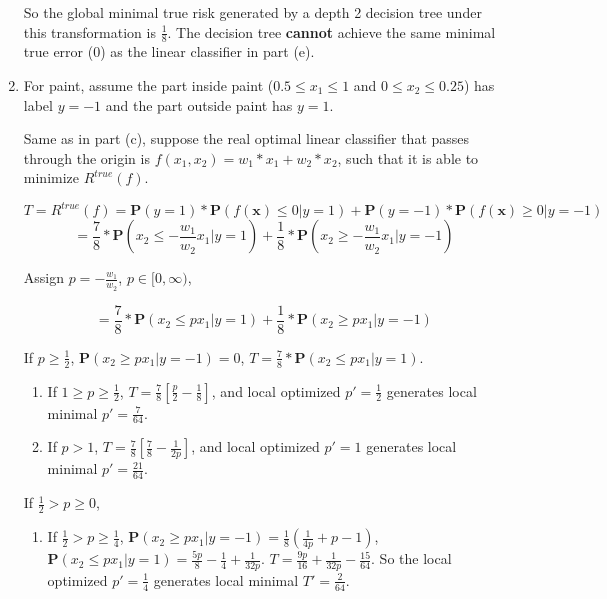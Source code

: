 \documentclass[paper=letter, fontsize=12pt]{article}
\begin{document}
\begin{enumerate}[label=(\alph*)]
	So the global minimal true risk generated by a depth 2 decision tree under this transformation is $\frac{1}{8}$. The decision tree \textbf{cannot} achieve the same minimal true error (0) as the linear classifier in part (e).
	
	\item For paint, assume the part inside paint ($0.5 \leq x_1 \leq 1$ and $0 \leq x_2 \leq 0.25$) has label $y = -1$ and the part outside paint has $y = 1$.
	 
	Same as in part (c), suppose the real optimal linear classifier that passes through the origin is $f(x_1, x_2) = w_1 * x_1 + w_2 * x_2$, such that it is able to minimize $R^{true}(f)$.
	
	\begin{equation}
	T = R^{true}(f) = \mathbf{P}(y = 1) * \mathbf{P}(f(\mathbf{x}) \leq 0 | y = 1) + \mathbf{P}(y = -1) * \mathbf{P}(f(\mathbf{x}) \geq 0 | y = -1)
	\end{equation}
	\begin{equation}
	= \frac{7}{8} * \mathbf{P}(x_2 \leq -\frac{w_1}{w_2} x_1 | y = 1) + \frac{1}{8} * \mathbf{P}(x_2 \geq -\frac{w_1}{w_2} x_1 | y = -1)
	\end{equation}
	
	Assign $p = -\frac{w_1}{w_2}$, $p \in [0, \infty)$,
	
	\begin{equation}
	= \frac{7}{8} * \mathbf{P}(x_2 \leq p x_1 | y = 1) + \frac{1}{8} * \mathbf{P}(x_2 \geq p x_1 | y = -1)
	\end{equation}
	
	If $p \geq \frac{1}{2}$, $\mathbf{P}(x_2 \geq p x_1 | y = -1) = 0$, $T = \frac{7}{8} * \mathbf{P}(x_2 \leq p x_1 | y = 1) $.
	
	\begin{enumerate}[label=(\roman*)]
		\item If $1 \geq p \geq \frac{1}{2}$, $T = \frac{7}{8}[\frac{p}{2} - \frac{1}{8}]$, and local optimized $p' = \frac{1}{2}$ generates local minimal $p' = \frac{7}{64}$.
		
		\item If $p > 1$, $T = \frac{7}{8}[\frac{7}{8} - \frac{1}{2p}]$, and local optimized $p' = 1$ generates local minimal $p' = \frac{21}{64}$.
	\end{enumerate}

	If $\frac{1}{2} > p \geq 0$,
	
	\begin{enumerate}[label=(\roman*)]
		\item If $\frac{1}{2} > p \geq \frac{1}{4}$,  $\mathbf{P}(x_2 \geq p x_1 | y = -1) = \frac{1}{8} (\frac{1}{4p} + p - 1)$, $\mathbf{P}(x_2 \leq p x_1 | y = 1) = \frac{5p}{8} - \frac{1}{4} + \frac{1}{32p}$. $T = \frac{9p}{16} + \frac{1}{32p} - \frac{15}{64}$. So the local optimized $p' = \frac{1}{4}$ generates local minimal $T' = \frac{2}{64}$.
		

\end{enumerate}
\end{enumerate}
\end{document}
